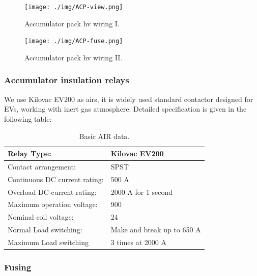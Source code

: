 \begin{figure}[H]
	\centering
	\texttt{[image: ./img/ACP-view.png]}
	\caption{Accumulator pack \gls{hv} wiring I.}
	\label{fig:acp-hv-wiring}
\end{figure}

\begin{figure}[H]
	\centering
	\texttt{[image: ./img/ACP-fuse.png]}
	\caption{Accumulator pack \gls{hv} wiring II.}
	\label{fig:acp-hv-wiring2}
\end{figure}

\subsubsection{Accumulator insulation relays}\label{subsec:airs}

We use Kilovac EV200 as \glspl{air}, it is widely used standard contactor designed for EVs, working with inert gas atmosphere. Detailed specification is given in the following table:

\begin{table}[H]
	\centering
	\caption{Basic AIR data.}
	\begin{tabu}{|X|X|}
		\hline
		Relay Type: & Kilovac EV200 \\
		\hline
		Contact arrangement: & SPST \\
		\hline
		Continuous DC current rating: & 500 A \\
		\hline
		Overload DC current rating:  & 2000 A for 1 second \\
		\hline
		Maximum operation voltage: & 900 \vdc \\
		\hline
		Nominal coil voltage: & 24 \vdc \\
		\hline
		Normal Load switching: & Make and break up to 650 A \\
		\hline
		Maximum Load switching & 3 times at 2000 A \\
		\hline
	\end{tabu}%
	\label{tab:acc-air}%
\end{table}%

\subsubsection{Fusing}

